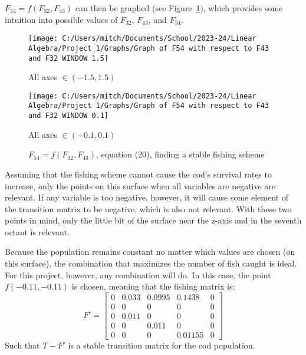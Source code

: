 \documentclass{article}
\begin{document}
    $F_{54} = f(F_{32}, F_{43})$ can then be graphed (see Figure~\ref{fig:stable_variables_graph}), which provides some intuition into possible values of $F_{32}$, $F_{43}$, and $F_{54}$.
    \begin{figure} [!h]
        \begin{minipage}{0.5\linewidth}
            \centering
            \texttt{[image: C:/Users/mitch/Documents/School/2023-24/Linear Algebra/Project 1/Graphs/Graph of F54 with respect to F43 and F32 WINDOW 1.5]}
            \caption*{All axes $\in(-1.5, 1.5)$}
        \end{minipage}\hfill
        \begin{minipage}{0.5\linewidth}
            \centering
            \texttt{[image: C:/Users/mitch/Documents/School/2023-24/Linear Algebra/Project 1/Graphs/Graph of F54 with respect to F43 and F32 WINDOW 0.1]}
            \caption*{All axes $\in(-0.1, 0.1)$}
        \end{minipage}
        \caption{$F_{54} = f(F_{32}, F_{43})$, equation (20), finding a stable fishing scheme}
        \label{fig:stable_variables_graph}
    \end{figure}

    Assuming that the fishing scheme cannot cause the cod's survival rates to increase, only the points on this surface when all variables are negative are relevant.
    If any variable is too negative, however, it will cause some element of the transition matrix to be negative, which is also not relevant.
    With these two points in mind, only the little bit of the surface near the z-axis and in the seventh octant is relevant.

    Because the population remains constant no matter which values are chosen (on this surface), the combination that maximizes the number of fish caught is ideal.
    For this project, however, any combination will do.
    In this case, the point $f(-0.11, -0.11)$ is chosen, meaning that the fishing matrix is:
    \begin{equation}
        F' =
        \begin{bmatrix}
            0    & 0.033 & 0.0995& 0.1438& 0   \\
            0    &  0    &  0    &  0    & 0   \\
            0    &  0.011&  0    &  0    & 0   \\
            0    &  0    &  0.011&  0    & 0   \\
            0    &  0    &  0    &  0.01155& 0
        \end{bmatrix}\label{eq:equation21}
    \end{equation}
    Such that $T - F'$ is a stable transition matrix for the cod population.
\end{document}
